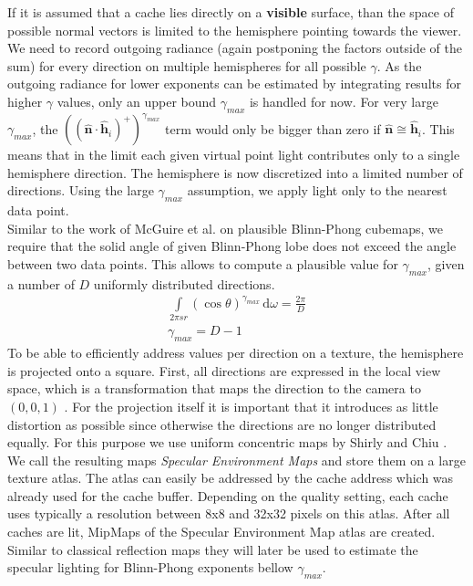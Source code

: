 \documentclass[thesis.tex]{subfiles}
\begin{document}
If it is assumed that a cache lies directly on a \textbf{visible} surface, than the space of possible normal vectors is limited to the hemisphere pointing towards the viewer.
We need to record outgoing radiance (again postponing the factors outside of the sum) for every direction on multiple hemispheres for all possible $\gamma$.
As the outgoing radiance for lower exponents can be estimated by integrating results for higher $\gamma$ values, only an upper bound $\gamma_{max}$ is handled for now.
For very large $\gamma_{max}$, the $((\hat{\mathbf{n}} \cdot \hat{\mathbf{h}}_i)^+)^{\gamma_{max}}$ term would only be bigger than zero if $\hat{\mathbf{n}} \cong \hat{\mathbf{h}}_i$.
This means that in the limit each given virtual point light contributes only to a single hemisphere direction.
The hemisphere is now discretized into a limited number of directions.
Using the large $\gamma_{max}$ assumption, we apply light only to the nearest data point.
\\
Similar to the work of McGuire et al. \cite{bib:envmipmap} on plausible Blinn-Phong cubemaps, we require that the solid angle of given Blinn-Phong lobe does not exceed the angle between two data points.
This allows to compute a plausible value for $\gamma_{max}$, given a number of $D$ uniformly distributed directions.
\begin{align}
\int\limits_{2\pi sr} (\cos\theta)^{\gamma_{max}}  \,\mathrm{d}\omega = \frac{2\pi}{D}\\
\gamma_{max} = D-1
\end{align}
%
To be able to efficiently address values per direction on a texture, the hemisphere is projected onto a square.
First, all directions are expressed in the local view space, which is a transformation that maps the direction to the camera to $(0,0,1)$ .
For the projection itself it is important that it introduces as little distortion as possible since otherwise the directions are no longer distributed equally.
For this purpose we use uniform concentric maps by Shirly and Chiu \cite{bib:concentricmaps}.
We call the resulting maps \emph{Specular Environment Maps} and store them on a large texture atlas.
The atlas can easily be addressed by the cache address which was already used for the cache buffer.
Depending on the quality setting, each cache uses typically a resolution between 8x8 and 32x32 pixels on this atlas.
After all caches are lit, MipMaps of the Specular Environment Map atlas are created.
Similar to classical reflection maps \cite[p.~308]{bib:RealtimeRenderingBook} they will later be used to estimate the specular lighting for Blinn-Phong exponents bellow $\gamma_{max}$.
\end{document}
